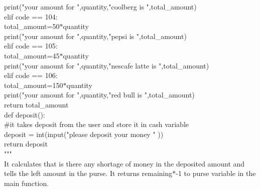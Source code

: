 \documentclass[10pt,a4paper]{article}
\begin{document}
\begin{flushleft}
\hspace*{0.5cm}\hspace*{0.5cm}        print("your amount for ",quantity,"coolberg is ",total\_amount)\\
\hspace*{0.5cm}    elif code == 104:\\
\hspace*{0.5cm}\hspace*{0.5cm}        total\_amount=50$\ast$quantity\\ 
\hspace*{0.5cm}\hspace*{0.5cm}        print("your amount for ",quantity,"pepsi is ",total\_amount)\\ 
\hspace*{0.5cm}    elif code == 105:\\
\hspace*{0.5cm}\hspace*{0.5cm}        total\_amount=45$\ast$quantity\\
\hspace*{0.5cm}\hspace*{0.5cm}        print("your amount for ",quantity,"nescafe latte is ",total\_amount)\\
\hspace*{0.5cm}    elif code == 106:\\
\hspace*{0.5cm}\hspace*{0.5cm}        total\_amount=150$\ast$quantity\\
\hspace*{0.5cm}\hspace*{0.5cm}        print("your amount for ",quantity,"red bull is ",total\_amount)\\
\hspace*{0.5cm}    return total\_amount\\
\bigskip        
def deposit():\\  \#it takes deposit from the user and store it in cash variable\\
\hspace*{0.5cm}    deposit = int(input("please deposit your money " ))\\
\hspace*{0.5cm}    return deposit\\
\bigskip
"""\\
It calculates that is there any shortage of money in the deposited amount and tells the left amount in the purse. It returns
remaining$\ast$-1 to purse variable in the main function.\\

\end{flushleft}
\end{document}
